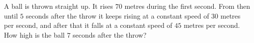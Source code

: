 A ball is thrown straight up. It rises $70$ metres during the first second. From then until $5$ seconds after the throw it keeps rising at a constant speed of $30$ metres per second, and after that it falls at a constant speed of $45$ metres per second. How high is the ball $7$ seconds after the throw?

